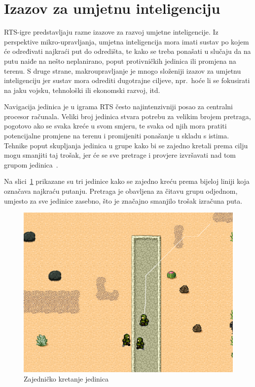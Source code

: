 \documentclass[times, utf8, zavrsni, numeric]{fer}
\begin{document}
\section{Izazov za umjetnu inteligenciju}

\par RTS-igre predstavljaju razne izazove za razvoj umjetne inteligencije. 
Iz perspektive mikro-upravljanja, umjetna inteligencija mora imati sustav po kojem će određivati najkraći put do odredišta, te kako se treba ponašati u slučaju da na putu naiđe na nešto neplanirano, poput protivničkih jedinica ili promjena na terenu. 
S druge strane, makroupravljanje je mnogo složeniji izazov za umjetnu inteligenciju jer sustav mora odrediti dugotrajne ciljeve, npr.\ hoće li se fokusirati na jaku vojsku, tehnološki ili ekonomski razvoj, itd.

\par Navigacija jedinica je u igrama RTS često najintenzivniji posao za centralni procesor računala.
Veliki broj jedinica stvara potrebu za velikim brojem pretraga, pogotovo ako se svaka kreće u svom smjeru, te svaka od njih mora pratiti potencijalne promjene na terenu i promijeniti ponašanje u skladu s istima.
Tehnike poput skupljanja jedinica u grupe kako bi se zajedno kretali prema cilju mogu smanjiti taj trošak, jer će se sve pretrage i provjere izvršavati nad tom grupom jedinica~\cite{book:AIGameProgrammingWisdom}. 

\par Na slici~\ref{fig:RTSgrouping} prikazane su tri jedinice kako se zajedno kreću prema bijeloj liniji koja označava najkraću putanju.
Pretraga je obavljena za čitavu grupu odjednom, umjesto za sve jedinice zasebno, što je značajno smanjilo trošak izračuna puta.

\begin{figure}[h] 
	\centering
	\includegraphics[width=0.6\linewidth]{images/RTSgrouping.png}
	\caption{Zajedničko kretanje jedinica}
	\label{fig:RTSgrouping}
\end{figure} 
\end{document}
